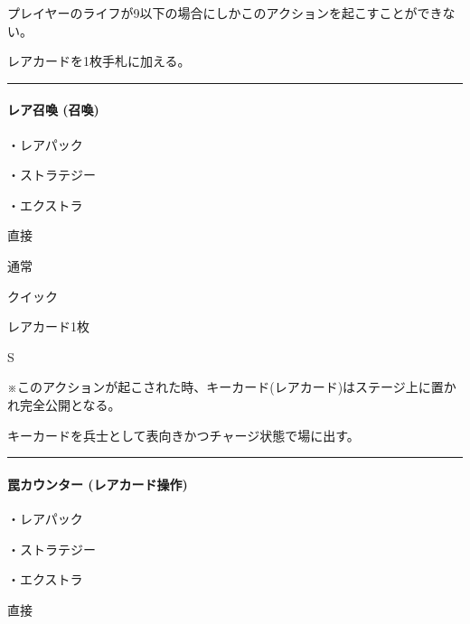 \documentclass[letterpaper,10pt,dvipdfmx]{sphinxmanual}
\begin{document}
\sphinxAtStartPar
プレイヤーのライフが9以下の場合にしかこのアクションを起こすことができない。

\sphinxAtStartPar
{}

\sphinxAtStartPar
レアカードを1枚手札に加える。


\bigskip\hrule\bigskip



\paragraph{レア召喚 (召喚)}
\label{\detokenize{auto/frameActionlist:act-summonsrare}}\label{\detokenize{auto/frameActionlist:id7}}
\sphinxAtStartPar
{}

\sphinxAtStartPar
・レアパック

\sphinxAtStartPar
・ストラテジー

\sphinxAtStartPar
・エクストラ

\sphinxAtStartPar
{} 直接

\sphinxAtStartPar
{} 通常

\sphinxAtStartPar
{} クイック

\sphinxAtStartPar
{} レアカード1枚

\sphinxAtStartPar
{} S

\sphinxAtStartPar
{} ※このアクションが起こされた時、キーカード(レアカード)はステージ上に置かれ完全公開となる。

\sphinxAtStartPar
{}

\sphinxAtStartPar
キーカードを兵士として表向きかつチャージ状態で場に出す。


\bigskip\hrule\bigskip



\paragraph{罠カウンター (レアカード操作)}
\label{\detokenize{auto/frameActionlist:act-trapcounter}}\label{\detokenize{auto/frameActionlist:id8}}
\sphinxAtStartPar
{}

\sphinxAtStartPar
・レアパック

\sphinxAtStartPar
・ストラテジー

\sphinxAtStartPar
・エクストラ

\sphinxAtStartPar
{} 直接
\end{document}

